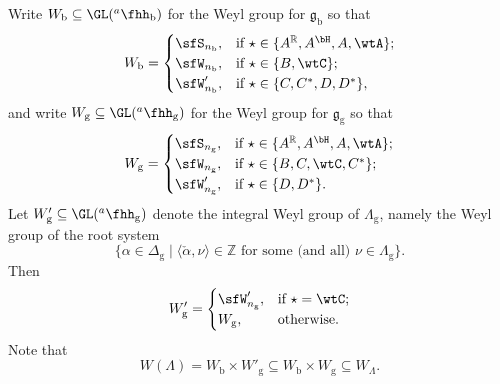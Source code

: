 \documentclass[12pt]{amsart}
\def\subset{\subseteq}
\newcommand{\g}{\mathfrak g}
\newcommand{\Z}{\mathbb{Z}}
\newcommand{\R}{\mathbb R}
\newcommand{\la}{\langle}
\newcommand{\ra}{\rangle}
\newcommand{\be}{\begin {equation}}
\newcommand{\ee}{\end {equation}}
\numberwithin{equation}{section}
\theoremstyle{remark}
\def\hha{{}^a\fhh}
\begin{document}
 Write $W_\mathrm b\subset \GL(\hha_\mathrm b)$ for the  Weyl group for $\g_\mathrm b$ so that
 \begin{equation}\label{def:Weylb}
   W_\mathrm b= \begin{cases}
    \sfS_{n_\mathrm b}, &  \text{if $\star \in \{A^\R, A^\bH, A, \wtA\} $}; \\
    \sfW_{n_\mathrm b}, &  \text{if $\star \in \{B,\wtC\} $};\\
     \sfW'_{n_\mathrm b}, &  \text{if $\star \in \{C,C^*, D, D^*\} $},\\
      \end{cases}
 \end{equation}
 and write $W_\mathrm g\subset \GL(\hha_\mathrm g)$ for the Weyl group for $\g_\mathrm g$ so that
 \begin{equation}\label{def:Weylg}
    W_\mathrm g= \begin{cases}
    \sfS_{n_\mathrm g}, &  \text{if $\star \in \{A^\R, A^\bH, A, \wtA\} $}; \\
    \sfW_{n_\mathrm g}, &  \text{if $\star \in \{B, C, \wtC, C^*\} $};\\
     \sfW'_{n_\mathrm g}, &  \text{if $\star \in \{ D, D^*\} $}.\\
      \end{cases}
 \end{equation}
Let $W'_\mathrm g\subset \GL(\hha_\mathrm g)$ denote the integral Weyl group of $\Lambda_\mathrm g$, namely the Weyl group of the root system
\[
  \{\alpha\in \Delta_\mathrm g\mid \la \check \alpha, \nu\ra\in \Z\textrm{ for some (and all) $\nu\in \Lambda_\mathrm g$}\}.
\]
 Then \[
   W'_\mathrm g= \begin{cases}
     \sfW'_{n_\mathrm g}, &  \text{if $\star =\wtC$};\\
     W_\mathrm g, &\text{otherwise}.
      \end{cases}
 \]
Note that
 \be\label{wl00}
   W(\Lambda)=
    W_{\mathrm b}\times W'_{\mathrm g}\subset W_{\mathrm b}\times W_{\mathrm g}\subset W_\Lambda. \ee
\end{document}
